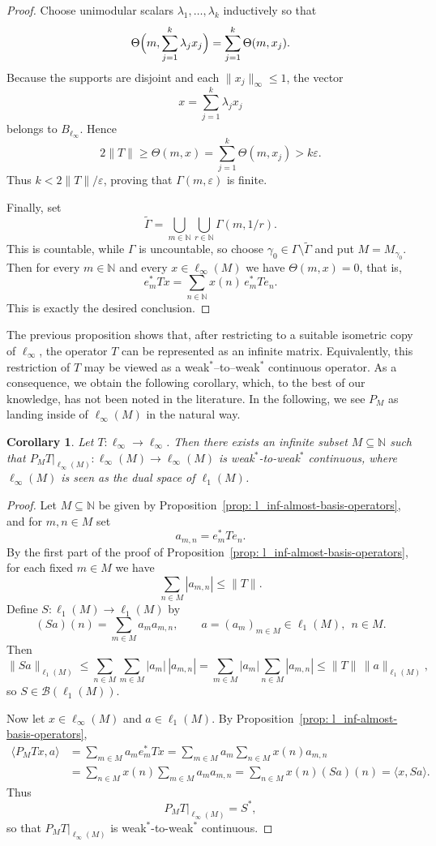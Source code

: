 \documentclass[11pt]{amsart}
\theoremstyle{plain}
\newtheorem{corollary}[theorem]{Corollary}
\theoremstyle{definition}
\numberwithin{equation}{section}
\newcommand{\norm}[1]{\lVert #1 \rVert}
\newcommand{\N}{\mathbb{N}}
\renewcommand{\le}{\leqslant}
\renewcommand{\ge}{\geqslant}
\begin{document}
\begin{proof}
Choose unimodular scalars $\lambda_1,\dots,\lambda_k$ inductively so that
\[
\Theta\Bigl(m,\sum_{j=1}^k \lambda_j x_j\Bigr)=\sum_{j=1}^k \Theta(m,x_j).
\]
Because the supports are disjoint and each $\norm{x_j}_\infty\le 1$, the vector
\[
 x=\sum_{j=1}^k \lambda_j x_j
\]
belongs to $B_{\ell_\infty}$. Hence
\[
2\norm{T}
\ge \Theta(m,x)
=\sum_{j=1}^k \Theta(m,x_j)
>k\varepsilon.
\]
Thus $k<2\norm{T}/\varepsilon$, proving that $\Gamma(m,\varepsilon)$ is finite.

Finally, set
\[
\widetilde\Gamma=\bigcup_{m\in\N}\bigcup_{r\in\N}\Gamma(m,1/r).
\]
This is countable, while $\Gamma$ is uncountable, so choose
$\gamma_0\in\Gamma\setminus\widetilde\Gamma$ and put $M=M_{\gamma_0}$.
Then for every $m\in\N$ and every $x\in\ell_\infty(M)$ we have $\Theta(m,x)=0$, that is,
\[
 e_m^*Tx=\sum_{n\in\N}x(n)\,e_m^*Te_n.
\]
This is exactly the desired conclusion.
\end{proof}


The previous proposition shows that, after restricting to a suitable isometric copy of $\ell_\infty$, the operator $T$ can be represented as an infinite matrix. Equivalently, this restriction of $T$ may be viewed as a weak$^*$–to–weak$^*$ continuous operator. As a consequence, we obtain the following corollary, which, to the best of our knowledge, has not been noted in the literature. In the following, we see $P_M$ as landing inside of $\ell_\infty(M)$ in the natural way.

\begin{corollary}\label{cor: weak-star-continuity}
    Let $T\colon \ell_\infty \to \ell_\infty$. Then there exists an infinite subset $M \subseteq \N$ such that $P_M T|_{\ell_\infty(M)} \colon \ell_\infty(M) \to \ell_\infty(M)$ is weak$^*$-to-weak$^*$ continuous, where $\ell_\infty(M)$ is seen as the dual space of $\ell_1(M)$.
\end{corollary}
\begin{proof}
Let $M\subseteq\N$ be given by Proposition~\ref{prop: l_inf-almost-basis-operators}, and for $m,n\in M$ set
\[
a_{m,n}=e_m^*Te_n.
\]
By the first part of the proof of Proposition~\ref{prop: l_inf-almost-basis-operators},
for each fixed $m\in M$ we have
\[
\sum_{n\in M}|a_{m,n}|\le \norm{T}.
\]
Define $S\colon \ell_1(M)\to \ell_1(M)$ by
\[
(Sa)(n)=\sum_{m\in M} a_m a_{m,n},
\qquad a=(a_m)_{m\in M}\in\ell_1(M),\ \ n\in M.
\]
Then
\[
\norm{Sa}_{\ell_1(M)}
\le \sum_{n\in M}\sum_{m\in M}|a_m|\,|a_{m,n}|
= \sum_{m\in M}|a_m|\sum_{n\in M}|a_{m,n}|
\le \norm{T}\,\norm{a}_{\ell_1(M)},
\]
so $S\in\mathcal B(\ell_1(M))$.

Now let $x\in\ell_\infty(M)$ and $a\in\ell_1(M)$. By Proposition~\ref{prop: l_inf-almost-basis-operators},
\begin{align*}
\langle P_MTx,a\rangle
&= \sum_{m\in M} a_m e_m^*Tx
 = \sum_{m\in M} a_m \sum_{n\in M} x(n)a_{m,n} \\
&= \sum_{n\in M} x(n)\sum_{m\in M} a_m a_{m,n}
 = \sum_{n\in M} x(n)(Sa)(n)
 = \langle x,Sa\rangle.
\end{align*}
Thus
\[
P_MT|_{\ell_\infty(M)}=S^*,
\]
so that $P_MT|_{\ell_\infty(M)}$ is weak$^*$-to-weak$^*$ continuous.
\end{proof}
\end{document}
